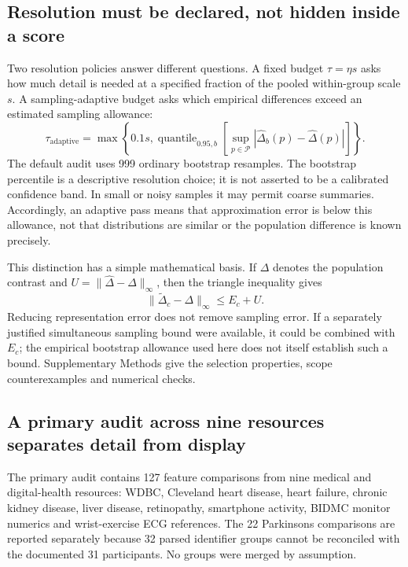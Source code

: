\documentclass[11pt]{article}
\begin{document}
\subsection*{Resolution must be declared, not hidden inside a score}
Two resolution policies answer different questions. A fixed budget $\tau=\eta s$ asks how much detail is needed at a specified fraction of the pooled within-group scale $s$. A sampling-adaptive budget asks which empirical differences exceed an estimated sampling allowance:
\begin{equation}\label{eq:tau}
\tau_{\mathrm{adaptive}}=\max\left\{0.1s,\operatorname{quantile}_{0.95,b}\left[\sup_{p\in\mathcal P}|\widehat\Delta_b(p)-\widehat\Delta(p)|\right]\right\}.
\end{equation}
The default audit uses 999 ordinary bootstrap resamples. The bootstrap percentile is a descriptive resolution choice; it is not asserted to be a calibrated confidence band. In small or noisy samples it may permit coarse summaries. Accordingly, an adaptive pass means that approximation error is below this allowance, not that distributions are similar or the population difference is known precisely.

This distinction has a simple mathematical basis. If $\Delta$ denotes the population contrast and $U=\|\widehat\Delta-\Delta\|_\infty$, then the triangle inequality gives
\begin{equation}\label{eq:bound}
\|\widetilde\Delta_c-\Delta\|_\infty\leq E_c+U.
\end{equation}
Reducing representation error does not remove sampling error. If a separately justified simultaneous sampling bound were available, it could be combined with $E_c$; the empirical bootstrap allowance used here does not itself establish such a bound. Supplementary Methods give the selection properties, scope counterexamples and numerical checks.



\subsection*{A primary audit across nine resources separates detail from display}
The primary audit contains 127 feature comparisons from nine medical and digital-health resources: WDBC, Cleveland heart disease, heart failure, chronic kidney disease, liver disease, retinopathy, smartphone activity, BIDMC monitor numerics and wrist-exercise ECG references.\cite{wdbc,heart,failure,kidney,liver,retina,har,bidmc,wrist} The 22 Parkinsons comparisons are reported separately because 32 parsed identifier groups cannot be reconciled with the documented 31 participants.\cite{parkinsons} No groups were merged by assumption.
\end{document}
